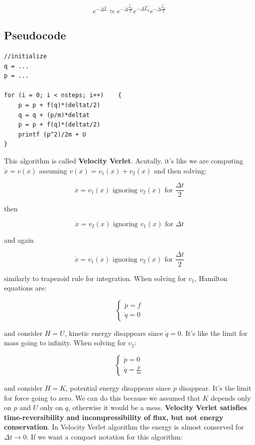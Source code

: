 \documentclass[a4paper, italian, openany]{book}
\begin{document}
$$e^{-\Delta \hat{L}} \simeq e^{-\Delta \frac{\hat{L_p}}{2}} e^{-\Delta \hat{L_q}} e^{-\Delta \frac{\hat{L_p}}{2}}$$

\subsection{Pseudocode}

\begin{lstlisting}
//initialize
q = ... 
p = ...

for (i = 0; i < nsteps; i++)	{
	p = p + f(q)*(deltat/2)
	q = q + (p/m)*deltat
	p = p + f(q)*(deltat/2)
	printf (p^2)/2m + U
}
\end{lstlisting}

This algorithm is called \textbf{Velocity Verlet}. Acutally, it's like we are computing $\dot{x} = v(x)$ assuming $v(x) = v_1(x) + v_2(x)$ and then solving:

$$\dot{x} = v_1(x) \mbox{ ignoring } v_2(x) \mbox{ for } \frac{\Delta t}{2}$$

then

$$\dot{x} = v_2(x) \mbox{ ignoring } v_1(x) \mbox{ for } \Delta t$$

and again

$$\dot{x} = v_1(x) \mbox{ ignoring } v_2(x) \mbox{ for } \frac{\Delta t}{2}$$

similarly to trapezoid rule for integration.\newline
When solving for $v_1$, Hamilton equations are:

$$\begin{cases}
\dot{p} = f \\
\dot{q} = 0
\end{cases}$$

and consider $H = U$, kinetic energy disappears since $\dot{q} = 0$. It's like the limit for mass going to infinity.
When solving for $v_2$:

$$\begin{cases}
\dot{p} = 0 \\
\dot{q} = \frac{p}{m}
\end{cases}$$

and consider $H = K$, potential energy disappears since $\dot{p}$ disappear. It's the limit for force going to zero.\newline
We can do this because we assumed that $K$ depends only on $p$ and $U$ only on $q$, otherwise it would be a mess.\newline
\textbf{Velocity Verlet satisfies time-reversibility and incompressibility of flux, but not energy conservation}. In Velocity Verlet algorithm the energy is almost conserved for $\Delta t \to 0$.\newline
If we want a compact notation for this algorithm:
\end{document}
